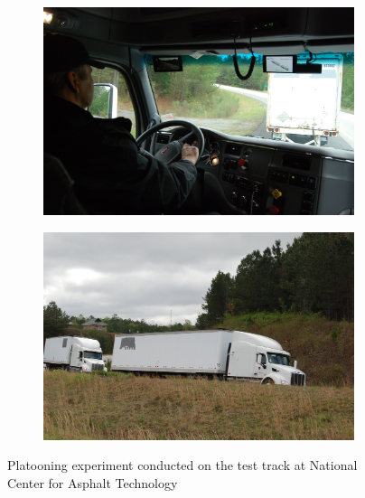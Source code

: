 \documentclass[12pt]{report}
\begin{document}
\begin{figure}[htb]
  \begin{subfigure}[h]{0.5\textwidth}
    \includegraphics[width=\textwidth]{figures/platooning-driver.JPG}
  \end{subfigure}
  \begin{subfigure}[h]{0.5\textwidth}
    \includegraphics[width=\textwidth]{figures/platooning.JPG}
  \end{subfigure}
  \caption{\label{fig:platooning}Platooning experiment conducted on the test track at National Center for Asphalt Technology}
\end{figure}
\end{document}
